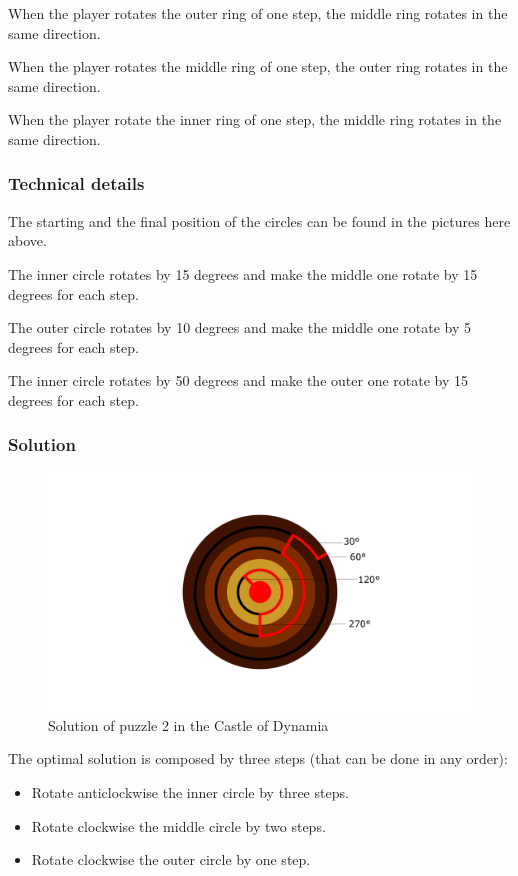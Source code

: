 When the player rotates the outer ring of one step, the middle ring rotates in the same direction.

When the player rotates the middle ring of one step, the outer ring rotates in the same direction.

When the player rotate the inner ring of one step, the middle ring rotates in the same direction.

\subsubsection*{Technical details}
The starting and the final position of the circles can be found in the pictures here above.

The inner circle rotates by 15 degrees and make the middle one rotate by 15 degrees for each step.

The outer circle rotates by 10 degrees and make the middle one rotate by 5 degrees for each step.

The inner circle rotates by 50 degrees and make the outer one rotate by 15 degrees for each step.


\subsubsection*{Solution}
\begin{figure}[H]
  \centering
  \includegraphics[width=\textwidth]{Images/Puzzles/torchPuzzleSolution}
  \caption{Solution of puzzle 2 in the Castle of Dynamia}
\end{figure}

The optimal solution is composed by three steps (that can be done in any order):
\begin{itemize}
	\item Rotate anticlockwise the inner circle by three steps.
	\item Rotate clockwise the middle circle by two steps.
	\item Rotate clockwise the outer circle by one step.
\end{itemize}

